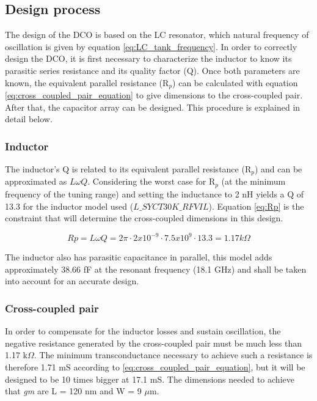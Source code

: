\subsection{Design process}
The design of the DCO is based on the LC resonator, which natural frequency of oscillation is given by equation \eqref{eq:LC_tank_frequency}. In order to correctly design the DCO, it is
first necessary to characterize the inductor to know its parasitic series resistance and its quality factor (Q). Once both parameters are known, the equivalent parallel resistance (R$_p$) can
be calculated with equation \eqref{eq:cross_coupled_pair_equation} to give dimensions to the cross-coupled pair. After that, the capacitor array can be designed. This procedure is explained in detail below.

\subsubsection{Inductor}
The inductor's Q is related to its equivalent parallel resistance (R$_p$) and can be approximated as $L\omega Q$. Considering the worst case for R$_p$ (at the minimum frequency of the tuning range)
and setting the inductance to 2 nH yields a Q of 13.3 for the inductor model used ($L\_SYCT30K\_RFVIL$). Equation \eqref{eq:Rp} is the constraint that will determine the cross-coupled dimensions in this design.


\begin{equation}
    Rp = L \omega Q = 2 \pi \cdot 2 x 10^{-9} \cdot 7.5 x 10^{9} \cdot 13.3 = 1.17 k \Omega
    \label{eq:Rp}
\end{equation}


The inductor also has parasitic capacitance in parallel, this model adds approximately 38.66 fF at the resonant frequency (18.1 GHz) and shall be taken into account for an accurate design.

\subsubsection{Cross-coupled pair}

In order to compensate for the inductor losses and sustain oscillation, the negative resistance generated by the cross-coupled pair must be much less than 1.17 k$\Omega$. The minimum transconductance necessary
to achieve such a resistance is therefore 1.71 mS according to \eqref{eq:cross_coupled_pair_equation}, but it will be designed to be 10 times bigger at 17.1 mS. The dimensions needed to achieve that \textit{gm}
are L = 120 nm and W = 9 $\mu$m.

